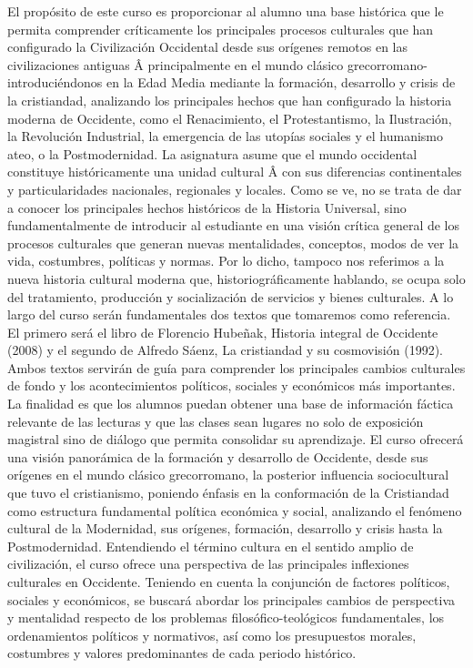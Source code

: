 \begin{syllabus}


\begin{justification}
El propósito de este curso es proporcionar al alumno una base histórica que le permita comprender críticamente los principales procesos culturales que han configurado la Civilización Occidental desde sus orígenes remotos en las civilizaciones antiguas Â principalmente en el mundo clásico grecorromano- introduciéndonos en la Edad Media mediante la formación, desarrollo y crisis de la cristiandad,  analizando los principales hechos que han configurado la historia moderna de Occidente, como el Renacimiento, el Protestantismo, la Ilustración, la Revolución Industrial, la emergencia de las utopías sociales y el humanismo ateo, o la Postmodernidad.
La asignatura asume que el mundo occidental constituye históricamente una unidad cultural Â con sus diferencias continentales y particularidades nacionales, regionales y locales.
Como se ve, no se trata de dar a conocer los principales hechos históricos de la Historia Universal,  sino fundamentalmente de introducir al estudiante en una visión crítica general de los procesos culturales que generan nuevas mentalidades, conceptos, modos de ver la vida, costumbres, políticas y normas. Por lo dicho, tampoco nos referimos a la nueva historia cultural moderna que, historiográficamente hablando, se ocupa solo del tratamiento, producción y socialización de servicios y bienes culturales.
A lo largo del curso serán fundamentales dos textos que tomaremos como referencia. El primero será el libro de Florencio Hubeñak, Historia integral de Occidente (2008) y el segundo de Alfredo Sáenz, La cristiandad y su cosmovisión (1992). Ambos textos servirán de guía para comprender los principales cambios culturales de fondo y los acontecimientos políticos, sociales y económicos más importantes.
La finalidad es que los alumnos puedan obtener una base de información fáctica relevante de las lecturas y que las clases sean lugares no solo de exposición magistral sino de diálogo que permita consolidar su aprendizaje.
El curso ofrecerá una visión panorámica de la formación y desarrollo de Occidente, desde sus orígenes en el mundo clásico grecorromano, la posterior influencia sociocultural que tuvo el cristianismo, poniendo énfasis en la conformación de la Cristiandad como estructura fundamental política económica y social, analizando el fenómeno cultural de la Modernidad, sus orígenes, formación, desarrollo y crisis hasta la Postmodernidad.  Entendiendo el término cultura en el sentido amplio de civilización, el curso ofrece una perspectiva de las principales inflexiones culturales en Occidente.
Teniendo en cuenta la conjunción de factores políticos, sociales y económicos, se buscará abordar los principales cambios de perspectiva y mentalidad respecto de los problemas filosófico-teológicos fundamentales, los ordenamientos políticos y normativos, así­ como los presupuestos morales, costumbres y valores predominantes de cada periodo histórico.
\end{justification}


\end{syllabus}

